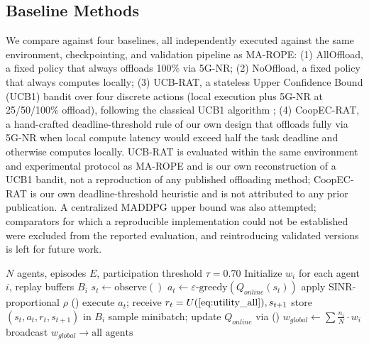 \subsection{Baseline Methods}

We compare against four baselines, all independently executed against the same environment, checkpointing, and validation pipeline as MA-ROPE: (1) AllOffload, a fixed policy that always offloads 100\% via 5G-NR; (2) NoOffload, a fixed policy that always computes locally; (3) UCB-RAT, a stateless Upper Confidence Bound (UCB1) bandit over four discrete actions (local execution plus 5G-NR at 25/50/100\% offload), following the classical UCB1 algorithm \cite{auer2002}; (4) CoopEC-RAT, a hand-crafted deadline-threshold rule of our own design that offloads fully via 5G-NR when local compute latency would exceed half the task deadline and otherwise computes locally. UCB-RAT is evaluated within the same environment and experimental protocol as MA-ROPE and is our own reconstruction of a UCB1 bandit, not a reproduction of any published offloading method; CoopEC-RAT is our own deadline-threshold heuristic and is not attributed to any prior publication. A centralized MADDPG \cite{lowe2017} upper bound was also attempted; comparators for which a reproducible implementation could not be established were excluded from the reported evaluation, and reintroducing validated versions is left for future work.



\begin{algorithm}[t]
\caption{MA-ROPE Training with FedAvg}
\label{alg:ma_rope}
\begin{algorithmic}[1]
\REQUIRE $N$ agents, episodes $E$, participation threshold $\tau=0.70$
\STATE Initialize $w_i$ for each agent $i$, replay buffers $B_i$
        \STATE $s_t \leftarrow \text{observe}()$ 
        \STATE $a_t \leftarrow \varepsilon\text{-greedy}(Q_{online}(s_t))$
        \STATE apply SINR-proportional $\rho$ ()
        \STATE execute $a_t$; receive $r_t = U (\text{\Cref{eq:utility_all}}), s_{t+1}$
        \STATE store $(s_t, a_t, r_t, s_{t+1})$ in $B_i$
        \STATE sample minibatch; update $Q_{online}$ via ()
    \ENDFOR
        \STATE $w_{global} \leftarrow \sum \frac{n_i}{N} \cdot w_i$ 
        \STATE broadcast $w_{global} \rightarrow \text{all agents}$
    \ENDIF
\ENDFOR
\end{algorithmic}
\end{algorithm}
